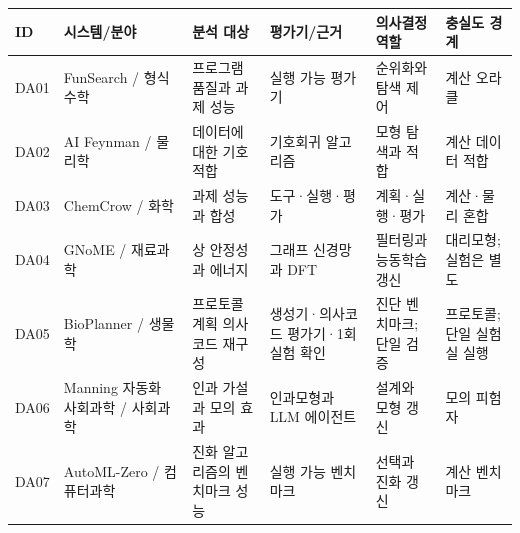 \begin{tabular}{@{}p{.05\linewidth}p{.20\linewidth}p{.16\linewidth}p{.16\linewidth}p{.15\linewidth}p{.13\linewidth}@{}}
\toprule
ID & 시스템/분야 & 분석 대상 & 평가기/근거 & 의사결정 역할 & 충실도 경계 \\
\midrule
DA01 & FunSearch / 형식수학 & 프로그램 품질과 과제 성능 & 실행 가능 평가기 & 순위화와 탐색 제어 & 계산 오라클 \\
DA02 & AI Feynman / 물리학 & 데이터에 대한 기호 적합 & 기호회귀 알고리즘 & 모형 탐색과 적합 & 계산 데이터 적합 \\
DA03 & ChemCrow / 화학 & 과제 성능과 합성 & 도구·실행·평가 & 계획·실행·평가 & 계산·물리 혼합 \\
DA04 & GNoME / 재료과학 & 상 안정성과 에너지 & 그래프 신경망과 DFT & 필터링과 능동학습 갱신 & 대리모형; 실험은 별도 \\
DA05 & BioPlanner / 생물학 & 프로토콜 계획 의사코드 재구성 & 생성기·의사코드 평가기·1회 실험 확인 & 진단 벤치마크; 단일 검증 & 프로토콜; 단일 실험실 실행 \\
DA06 & Manning 자동화 사회과학 / 사회과학 & 인과 가설과 모의 효과 & 인과모형과 LLM 에이전트 & 설계와 모형 갱신 & 모의 피험자 \\
DA07 & AutoML-Zero / 컴퓨터과학 & 진화 알고리즘의 벤치마크 성능 & 실행 가능 벤치마크 & 선택과 진화 갱신 & 계산 벤치마크 \\
\bottomrule
\end{tabular}
